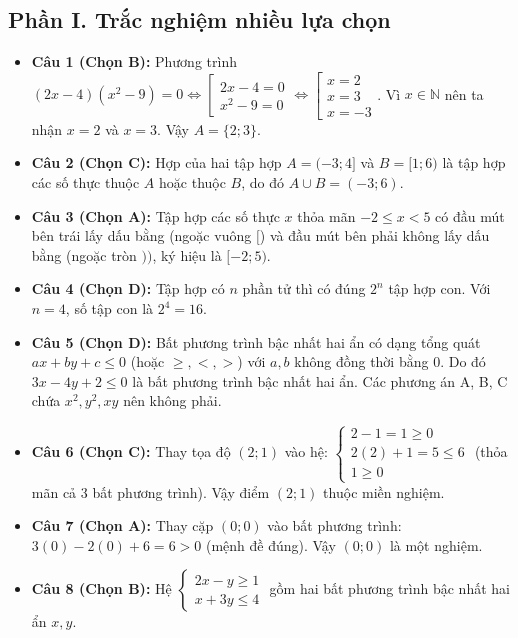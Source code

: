 \documentclass[12pt,a4paper]{article}
\begin{document}
\subsection*{Phần I. Trắc nghiệm nhiều lựa chọn}
\begin{itemize}[leftmargin=0.6cm, itemsep=3pt]
\item \textbf{Câu 1 (Chọn B):} Phương trình $(2x - 4)(x^2 - 9) = 0 \iff \left[\begin{array}{l} 2x - 4 = 0 \\ x^2 - 9 = 0 \end{array}\right. \iff \left[\begin{array}{l} x = 2 \\ x = 3 \\ x = -3 \end{array}\right.$. Vì $x \in \mathbb{N}$ nên ta nhận $x = 2$ và $x = 3$. Vậy $A = \{2; 3\}$.
\item \textbf{Câu 2 (Chọn C):} Hợp của hai tập hợp $A = (-3; 4]$ và $B = [1; 6)$ là tập hợp các số thực thuộc $A$ hoặc thuộc $B$, do đó $A \cup B = (-3; 6)$.
\item \textbf{Câu 3 (Chọn A):} Tập hợp các số thực $x$ thỏa mãn $-2 \leq x < 5$ có đầu mút bên trái lấy dấu bằng (ngoặc vuông $[$) và đầu mút bên phải không lấy dấu bằng (ngoặc tròn $))$, ký hiệu là $[-2; 5)$.
\item \textbf{Câu 4 (Chọn D):} Tập hợp có $n$ phần tử thì có đúng $2^n$ tập hợp con. Với $n = 4$, số tập con là $2^4 = 16$.
\item \textbf{Câu 5 (Chọn D):} Bất phương trình bậc nhất hai ẩn có dạng tổng quát $ax + by + c \leq 0$ (hoặc $\geq, <, >$) với $a, b$ không đồng thời bằng $0$. Do đó $3x - 4y + 2 \leq 0$ là bất phương trình bậc nhất hai ẩn. Các phương án A, B, C chứa $x^2, y^2, xy$ nên không phải.
\item \textbf{Câu 6 (Chọn C):} Thay tọa độ $(2; 1)$ vào hệ: $\begin{cases} 2 - 1 = 1 \geq 0 \\ 2(2) + 1 = 5 \leq 6 \\ 1 \geq 0 \end{cases}$ (thỏa mãn cả 3 bất phương trình). Vậy điểm $(2; 1)$ thuộc miền nghiệm.
\item \textbf{Câu 7 (Chọn A):} Thay cặp $(0; 0)$ vào bất phương trình: $3(0) - 2(0) + 6 = 6 > 0$ (mệnh đề đúng). Vậy $(0; 0)$ là một nghiệm.
\item \textbf{Câu 8 (Chọn B):} Hệ $\begin{cases} 2x - y \geq 1 \\ x + 3y \leq 4 \end{cases}$ gồm hai bất phương trình bậc nhất hai ẩn $x, y$.

\end{itemize}
\end{document}
